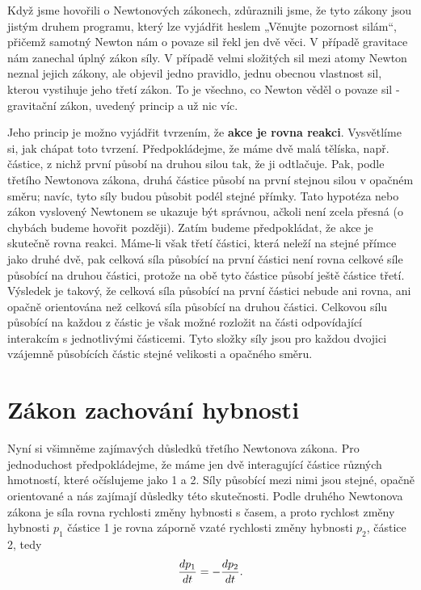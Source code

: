 {    Když jsme hovořili o Newtonových zákonech, zdůraznili jsme, že tyto zákony jsou jistým druhem 
    programu, který lze vyjádřit heslem „Věnujte pozornost silám“, přičemž samotný Newton nám o 
    povaze sil řekl jen dvě věci. V případě gravitace nám zanechal úplný zákon síly. V případě 
    velmi složitých sil mezi atomy Newton neznal jejich zákony, ale objevil jedno pravidlo, jednu 
    obecnou vlastnost sil, kterou vystihuje jeho třetí zákon. To je všechno, co Newton věděl o 
    povaze sil - gravitační zákon, uvedený princip a už nic víc.
    
    Jeho princip je možno vyjádřit tvrzením, že \textbf{akce je rovna reakci}. Vysvětlíme si, jak 
    chápat toto tvrzení. Předpokládejme, že máme dvě malá tělíska, např. částice, z nichž první 
    působí na druhou silou tak, že ji odtlačuje. Pak, podle třetího Newtonova zákona, druhá částice 
    působí na první stejnou silou v opačném směru; navíc, tyto síly budou působit podél stejné 
    přímky. Tato hypotéza nebo zákon vyslovený Newtonem se ukazuje být správnou, ačkoli není zcela 
    přesná (o chybách budeme hovořit později). Zatím budeme předpokládat, že akce je skutečně rovna 
    reakci. Máme-li však třetí částici, která neleží na stejné přímce jako druhé dvě, pak celková 
    síla působící na první částici není rovna celkové síle působící na druhou částici, protože na 
    obě tyto částice působí ještě částice třetí. Výsledek je takový, že celková síla působící na 
    první částici nebude ani rovna, ani opačně orientována než celková síla působící na druhou 
    částici. Celkovou sílu působící na každou z částic je však možné rozložit na části odpovídající 
    interakcím s jednotlivými částicemi. Tyto složky síly jsou pro každou dvojici vzájemně 
    působících částic stejné velikosti a opačného směru.
    
  \section{Zákon zachování hybnosti}
    Nyní si všimněme zajímavých důsledků třetího Newtonova zákona. Pro jednoduchost předpokládejme, 
    že máme jen dvě interagující částice různých hmotností, které očíslujeme jako 1 a 2. Síly 
    působící mezi nimi jsou stejné, opačně orientované a nás zajímají důsledky této skutečnosti. 
    Podle druhého Newtonova zákona je síla rovna rychlosti změny hybnosti s časem, a proto rychlost 
    změny hybnosti \(p_1\)  částice 1 je rovna záporně vzaté rychlosti změny hybnosti \(p_2\), 
    částice 2, tedy
    \begin{equation}\label{FYZ:eq136}
      \frac{d p_1}{d t} = - \frac{d p_2}{d t}.
    \end{equation}
    
}
